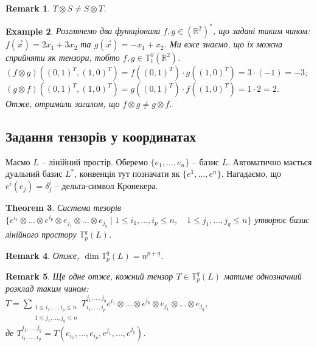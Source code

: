 \documentclass[a4paper, 10pt]{article}
\theoremstyle{theoremdd}
\newtheorem{theorem}{Theorem}[subsection]
\newtheorem{example}[theorem]{Example}
\newtheorem{remark}[theorem]{Remark}
\begin{document}
\begin{remark}
$T \otimes S \neq S \otimes T$.
\end{remark}

\begin{example}
Розглянемо два функціонали $f,g \in (\mathbb{R}^2)^*$, що задані таким чином: $f(\vec{x}) = 2x_1 + 3x_2$ та $g(\vec{x}) = -x_1 + x_2$. Ми вже знаємо, що їх можна сприйняти як тензори, тобто $f,g \in \mathbb{T}_1^0(\mathbb{R}^2)$.\\
$(f \otimes g)( (0,1)^T, (1,0)^T) = f((0,1)^T) \cdot g( (1,0)^T) = 3 \cdot (-1) = -3$;\\
$(g \otimes f)( (0,1)^T, (1,0)^T) = g((0,1)^T) \cdot f((1,0)^T) = 1 \cdot 2 = 2$.\\
Отже, отримали загалом, що $f \otimes g \neq g \otimes f$.
\end{example}

\subsection{Задання тензорів у координатах}
Маємо $L$ -- лінійний простір. Оберемо $\{e_1,\dots,e_n\}$ -- базис $L$. Автоматично мається дуальний базис $L^*$, конвенція тут позначати як $\{e^1,\dots,e^n\}$. Нагадаємо, що $e^i(e_j) = \delta_{j}^i$ -- дельта-символ Кронекера.

\begin{theorem}
Система тезорів $\{ e^{i_1} \otimes \dots \otimes e^{i_p} \otimes e_{j_1} \otimes \dots \otimes e_{j_q} \mid 1 \leq i_1,\dots,i_p \leq n, \quad 1 \leq j_1,\dots,j_q \leq n \}$ утворює базис лінійного простору $\mathbb{T}_p^q(L)$.
\end{theorem}

\begin{remark}
Отже, $\dim \mathbb{T}_p^q(L) = n^{p+q}$.
\end{remark}

\begin{remark}
Ще одне отже, кожний тензор $T \in \mathbb{T}_p^q(L)$ матиме однозначний розклад таким чином:\\
$T = \displaystyle\sum_{\substack{1 \leq i_1,\dots,i_p \leq n \\ 1 \leq j_1,\dots,j_q \leq n}} T_{i_1,\dots,i_p}^{j_1,\dots,j_q} e^{i_1} \otimes \dots \otimes e^{i_p} \otimes e_{j_1} \otimes \dots \otimes e_{j_q}$,\\
де $T_{i_1,\dots,i_p}^{j_1,\dots,j_q} = T(e_{i_1},\dots,e_{i_p},e^{j_1},\dots,e^{j_q})$.
\end{remark}
\end{document}
